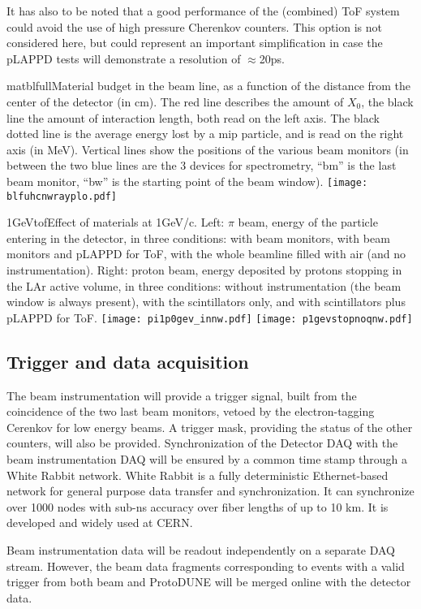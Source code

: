 It has also to be noted that a good performance of the (combined) ToF system could avoid the use of high pressure  Cherenkov counters. This option is not considered here, but could
represent an important simplification  in case the pLAPPD tests will demonstrate a resolution of $\approx$20ps.
 \begin{cdrfigure}{matblfull}{Material budget in the beam line, as a function of the distance from the center of the detector (in cm). The red line describes the amount of $X_0$, the black line the amount of interaction length, both read on the left axis. The black dotted line is the average energy lost by a mip particle, and is read on the right axis (in MeV). Vertical lines show the positions of the various beam monitors (in between the two blue lines are the 3 devices for spectrometry, ``bm'' is the last beam monitor, ``bw'' is the starting point of the beam window).}  
\texttt{[image: blfuhcnwrayplo.pdf]}
\end{cdrfigure}
%
 \begin{cdrfigure}{1GeVtof}{Effect of materials at  1GeV/c. Left: $\pi$ beam, energy of the particle entering in the detector, in three conditions: with  beam monitors, with beam monitors and pLAPPD for ToF, with the whole beamline filled with air (and no instrumentation). Right: proton beam, energy deposited by protons stopping in the LAr active volume, in three conditions: without instrumentation (the beam window is always present), with the scintillators only, and with scintillators plus pLAPPD for ToF.}
\texttt{[image: pi1p0gev\_innw.pdf]}
\texttt{[image: p1gevstopnoqnw.pdf]}
\end{cdrfigure}



\subsection {Trigger and data acquisition}
The beam instrumentation will provide a trigger signal, built from the coincidence of the two last beam monitors, vetoed by the electron-tagging Cerenkov for low energy beams. A trigger mask, providing the status of the other counters, will also be provided. 
 Synchronization of the Detector DAQ with the beam instrumentation DAQ will be ensured by a common time stamp through a White Rabbit network.
 White Rabbit is a fully deterministic Ethernet-based network for general purpose data transfer and synchronization. It can synchronize over 1000 nodes with sub-ns accuracy over fiber lengths of up to 10 km. It is developed and widely used at CERN.

Beam instrumentation data will be readout independently on a separate DAQ stream. However,  
the beam data fragments corresponding to  events with a valid trigger from both beam and ProtoDUNE will be merged online with the detector data.
 
